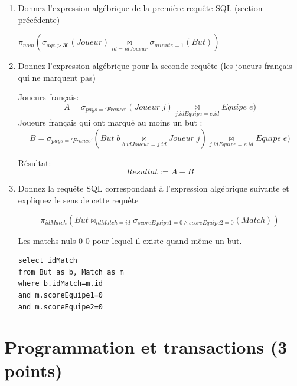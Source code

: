 \begin{enumerate}
   \item Donnez l'expression algébrique de la première requête SQL (section précédente)

\begin{solution}
$\pi_{nom}(\sigma_{age > 30} (Joueur) \underset{id=idJoueur}{\bowtie} \sigma_{minute = 1}(But) )$
\end{solution}

\item Donnez l'expression algébrique pour la seconde requête (les joueurs français qui ne marquent pas)

\begin{solution}
Joueurs français:
$$A = \sigma_{pays='France'}(Joueur\;j) \underset{j.idEquipe = e.id}{\bowtie} Equipe\;e)$$
Joueurs français qui ont marqué au moins un but :
$$B = \sigma_{pays='France'}(But\;b \underset{b.idJoueur = j.id}{\bowtie} Joueur\;j) \underset{j.idEquipe = e.id}{\bowtie} Equipe\;e)$$

Résultat:\\
$$Resultat := A - B$$
\end{solution}

\item Donnez la requête SQL correspondant à l'expression algébrique suivante et expliquez le sens de cette requête

$$\pi_{idMatch}(But \Join_{idMatch=id} \sigma_{scoreEquipe1=0 \land scoreEquipe2=0}(Match))$$
\begin{solution}
Les matchs nuls 0-0 pour lequel il existe quand même un but.
\begin{verbatim}
select idMatch
from But as b, Match as m
where b.idMatch=m.id
and m.scoreEquipe1=0 
and m.scoreEquipe2=0
\end{verbatim}
\end{solution}
\end{enumerate}

\section{Programmation et transactions (3 points)}

